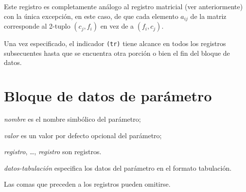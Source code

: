 \documentclass[11pt,spanish]{report}
\def\para#1{\noindent{\bf#1}}
\begin{document}
Este registro es completamente análogo al registro matricial (ver anteriormente) con la única excepción, en este caso, de que cada elemento $a_{ij}$ de la matriz corresponde al 2-tuplo $(c_j,f_i)$ en vez de a $(f_i,c_j)$.

Una vez especificado, el indicador {\tt(tr)} tiene alcance en todos los registros subsecuentes hasta que se encuentra otra porción o bien el fin del bloque de datos.

\section{Bloque de datos de parámetro}

\noindent
{}

\medskip

\noindent
{\it nombre} es el nombre simbólico del parámetro;

\noindent
{\it valor} es un valor por defecto opcional del parámetro;

\noindent
{\it registro}, \dots, {\it registro} son registros.

\noindent
{\it datos-tabulación} especifica los datos del parámetro en el formato tabulación.

\noindent
Las comas que preceden a los registros pueden omitirse.

\para{Registros}

\vspace*{-8pt}
\end{document}
